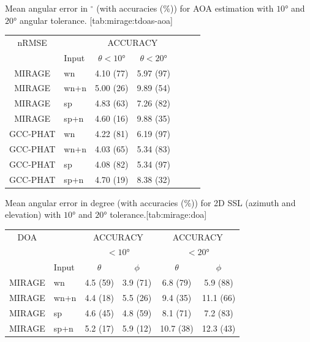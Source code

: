 \begin{table}[t]
    \begin{sidecaption}{%
        Mean angular error in ${}^\circ$ (with accuracies ($\%$)) for AOA estimation with $\ang{10}$ and $\ang{20}$ angular tolerance.
    }[tab:mirage:tdoas-aoa]
    \small
    \begin{tabular*}{\linewidth}{@{\extracolsep{\fill}}cl|ccc|cc@{}}
    \toprule
                 nRMSE        &                   &\multicolumn{2}{c}{ACCURACY}  \\
                & Input   &  $\theta<\ang{10}$ &  $\theta<\ang{20}$ \\
    \midrule
    MIRAGE      &   wn    & 4.10 (77)	& 5.97 (97) \\
    MIRAGE      &   wn+n  & 5.00 (26)	& 9.89 (54) \\
    MIRAGE      &   sp    & 4.83 (63)	& 7.26 (82) \\
    MIRAGE      &   sp+n  & 4.60 (16)	& 9.88 (35) \\
    GCC-PHAT    &   wn    & 4.22 (81) & 6.19 (97) \\
    GCC-PHAT    &   wn+n  & 4.03 (65) & 5.34 (83) \\
    GCC-PHAT    &   sp 	  & 4.08 (82) & 5.34 (97) \\
    GCC-PHAT    &   sp+n  & 4.70 (19) & 8.38 (32) \\
    \bottomrule
    \end{tabular*}
    \end{sidecaption}
\end{table}
\begin{table}[t]
    \begin{sidecaption}{%
        Mean angular error in degree (with accuracies ($\%$)) for 2D SSL (azimuth and elevation)
        with $\ang{10}$ and $\ang{20}$ tolerance.}[tab:mirage:doa]
        \small
        \centering
        \begin{tabular*}{\linewidth}{@{\extracolsep{\fill}}cl|cc|cc@{}}
        \toprule
        \ac{DOA}        &            &  \multicolumn{2}{c|}{ACCURACY}    &   \multicolumn{2}{c}{ACCURACY} \\
                        &            &  \multicolumn{2}{c|}{$<\ang{10}$} &   \multicolumn{2}{c}{$<\ang{20}$} \\
                        &    Input   &  $\theta$ &  $\phi$ &  $\theta$ &  $\phi$ \\
        \midrule
        MIRAGE &  wn    &   4.5 (59) &  3.9 (71) &   6.8 (79) &   5.9 (88) \\
        MIRAGE &  wn+n  &   4.4 (18) &  5.5 (26) &   9.4 (35) &  11.1 (66) \\
        MIRAGE &  sp    &   4.6 (45) &  4.8 (59) &   8.1 (71) &   7.2 (83) \\
        MIRAGE &  sp+n  &   5.2 (17) &  5.9 (12) &  10.7 (38) &  12.3 (43) \\
        \bottomrule
        \end{tabular*}
    \end{sidecaption}
\end{table}

